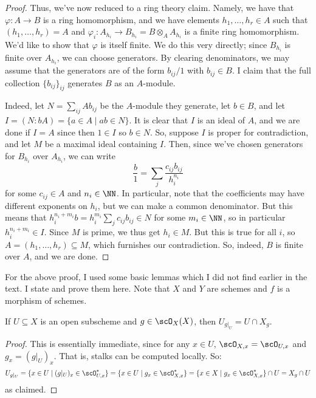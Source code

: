 \begin{proof}
	Thus, we've now reduced to a ring theory claim. Namely, we have that $\varphi : A \to B$ is a ring homomorphism, and we have elements $h_1,\ldots,h_r \in A$ such that $(h_1,\ldots,h_r) = A$ and $\varphi_i : A_{h_i} \to B_{h_i} = B \otimes_A A_{h_i}$ is a finite ring homomorphism. We'd like to show that $\varphi$ is itself finite. We do this very directly; since $B_{h_i}$ is finite over $A_{h_i}$, we can choose generators. By clearing denominators, we may assume that the generators are of the form $b_{ij}/1$ with $b_{ij} \in B$. I claim that the full collection $\{b_{ij}\}_{ij}$ generates $B$ as an $A$-module.
	
	Indeed, let $N = \sum_{ij} Ab_{ij}$ be the $A$-module they generate, let $b \in B$, and let $I = (N : bA) = \{ a \in A \mid ab \in N \}$. It is clear that $I$ is an ideal of $A$, and we are done if $I = A$ since then $1 \in I$ so $b \in N$. So, suppose $I$ is proper for contradiction, and let $M$ be a maximal ideal containing $I$. Then, since we've chosen generators for $B_{h_i}$ over $A_{h_i}$, we can write
	\[ \frac{b}{1} = \sum_j \frac{c_{ij}b_{ij}}{h_i^{n_i}} \]
	for some $c_{ij} \in A$ and $n_i \in \NN$. In particular, note that the coefficients may have different exponents on $h_i$, but we can make a common denominator. But this means that $h_i^{n_i+m_i}b = h_i^{m_i}\sum_j c_{ij}b_{ij} \in N$ for some $m_i \in \NN$, so in particular $h_i^{n_i+m_i} \in I$. Since $M$ is prime, we thus get $h_i \in M$. But this is true for all $i$, so $A = (h_1,\ldots,h_r) \subseteq M$, which furnishes our contradiction. So, indeed, $B$ is finite over $A$, and we are done.
\end{proof}

For the above proof, I used some basic lemmas which I did not find earlier in the text. I state and prove them here. Note that $X$ and $Y$ are schemes and $f$ is a morphism of schemes.

\begin{lem} If $U \subseteq X$ is an open subscheme and $g \in \scO_X(X)$, then $U_{g|_U} = U \cap X_g$. \end{lem}
\begin{proof}
	This is essentially immediate, since for any $x \in U$, $\scO_{X,x} = \scO_{U,x}$ and $g_x = (g|_U)_x$. That is, stalks can be computed locally. So:
	\[ U_{g|_U} = \{x \in U \mid (g|_U)_x \in \scO_{U,x}^\ast\} = \{x \in U \mid g_x \in \scO_{X,x}^\ast \} = \{x \in X \mid g_x \in \scO_{X,x}^\ast\} \cap U = X_g \cap U \]
	as claimed.
\end{proof}

